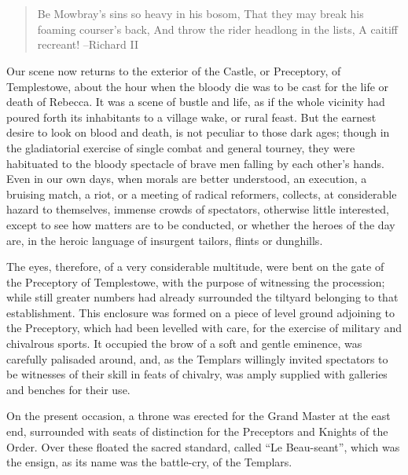 \chapter{}

\begin{quote}
Be Mowbray's sins so heavy in his bosom,
That they may break his foaming courser's back,
And throw the rider headlong in the lists,
A caitiff recreant!
--Richard II
\end{quote}

Our scene now returns to the exterior of the Castle, or Preceptory, of
Templestowe, about the hour when the bloody die was to be cast for the
life or death of Rebecca. It was a scene of bustle and life, as if the
whole vicinity had poured forth its inhabitants to a village wake, or
rural feast. But the earnest desire to look on blood and death, is not
peculiar to those dark ages; though in the gladiatorial exercise of
single combat and general tourney, they were habituated to the bloody
spectacle of brave men falling by each other's hands. Even in our own
days, when morals are better understood, an execution, a bruising match,
a riot, or a meeting of radical reformers, collects, at considerable
hazard to themselves, immense crowds of spectators, otherwise little
interested, except to see how matters are to be conducted, or whether
the heroes of the day are, in the heroic language of insurgent tailors,
flints or dunghills.

The eyes, therefore, of a very considerable multitude, were bent on the
gate of the Preceptory of Templestowe, with the purpose of witnessing
the procession; while still greater numbers had already surrounded the
tiltyard belonging to that establishment. This enclosure was formed on a
piece of level ground adjoining to the Preceptory, which had been
levelled with care, for the exercise of military and chivalrous sports.
It occupied the brow of a soft and gentle eminence, was carefully
palisaded around, and, as the Templars willingly invited spectators to
be witnesses of their skill in feats of chivalry, was amply supplied
with galleries and benches for their use.

On the present occasion, a throne was erected for the Grand Master at
the east end, surrounded with seats of distinction for the Preceptors
and Knights of the Order. Over these floated the sacred standard, called
``Le Beau-seant'', which was the ensign, as its name was the battle-cry,
of the Templars.

